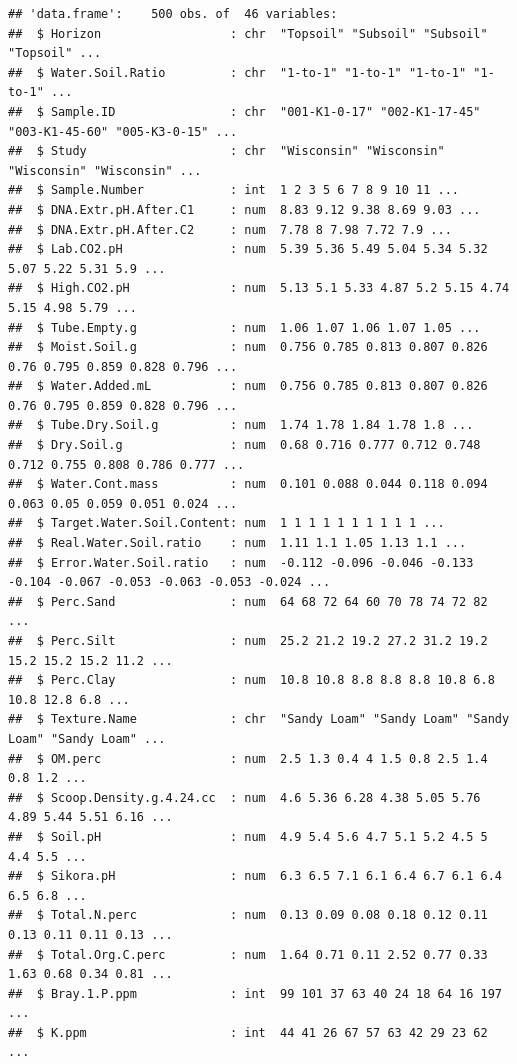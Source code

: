 \documentclass[]{article}
\begin{document}
\begin{verbatim}
## 'data.frame':    500 obs. of  46 variables:
##  $ Horizon                  : chr  "Topsoil" "Subsoil" "Subsoil" "Topsoil" ...
##  $ Water.Soil.Ratio         : chr  "1-to-1" "1-to-1" "1-to-1" "1-to-1" ...
##  $ Sample.ID                : chr  "001-K1-0-17" "002-K1-17-45" "003-K1-45-60" "005-K3-0-15" ...
##  $ Study                    : chr  "Wisconsin" "Wisconsin" "Wisconsin" "Wisconsin" ...
##  $ Sample.Number            : int  1 2 3 5 6 7 8 9 10 11 ...
##  $ DNA.Extr.pH.After.C1     : num  8.83 9.12 9.38 8.69 9.03 ...
##  $ DNA.Extr.pH.After.C2     : num  7.78 8 7.98 7.72 7.9 ...
##  $ Lab.CO2.pH               : num  5.39 5.36 5.49 5.04 5.34 5.32 5.07 5.22 5.31 5.9 ...
##  $ High.CO2.pH              : num  5.13 5.1 5.33 4.87 5.2 5.15 4.74 5.15 4.98 5.79 ...
##  $ Tube.Empty.g             : num  1.06 1.07 1.06 1.07 1.05 ...
##  $ Moist.Soil.g             : num  0.756 0.785 0.813 0.807 0.826 0.76 0.795 0.859 0.828 0.796 ...
##  $ Water.Added.mL           : num  0.756 0.785 0.813 0.807 0.826 0.76 0.795 0.859 0.828 0.796 ...
##  $ Tube.Dry.Soil.g          : num  1.74 1.78 1.84 1.78 1.8 ...
##  $ Dry.Soil.g               : num  0.68 0.716 0.777 0.712 0.748 0.712 0.755 0.808 0.786 0.777 ...
##  $ Water.Cont.mass          : num  0.101 0.088 0.044 0.118 0.094 0.063 0.05 0.059 0.051 0.024 ...
##  $ Target.Water.Soil.Content: num  1 1 1 1 1 1 1 1 1 1 ...
##  $ Real.Water.Soil.ratio    : num  1.11 1.1 1.05 1.13 1.1 ...
##  $ Error.Water.Soil.ratio   : num  -0.112 -0.096 -0.046 -0.133 -0.104 -0.067 -0.053 -0.063 -0.053 -0.024 ...
##  $ Perc.Sand                : num  64 68 72 64 60 70 78 74 72 82 ...
##  $ Perc.Silt                : num  25.2 21.2 19.2 27.2 31.2 19.2 15.2 15.2 15.2 11.2 ...
##  $ Perc.Clay                : num  10.8 10.8 8.8 8.8 8.8 10.8 6.8 10.8 12.8 6.8 ...
##  $ Texture.Name             : chr  "Sandy Loam" "Sandy Loam" "Sandy Loam" "Sandy Loam" ...
##  $ OM.perc                  : num  2.5 1.3 0.4 4 1.5 0.8 2.5 1.4 0.8 1.2 ...
##  $ Scoop.Density.g.4.24.cc  : num  4.6 5.36 6.28 4.38 5.05 5.76 4.89 5.44 5.51 6.16 ...
##  $ Soil.pH                  : num  4.9 5.4 5.6 4.7 5.1 5.2 4.5 5 4.4 5.5 ...
##  $ Sikora.pH                : num  6.3 6.5 7.1 6.1 6.4 6.7 6.1 6.4 6.5 6.8 ...
##  $ Total.N.perc             : num  0.13 0.09 0.08 0.18 0.12 0.11 0.13 0.11 0.11 0.13 ...
##  $ Total.Org.C.perc         : num  1.64 0.71 0.11 2.52 0.77 0.33 1.63 0.68 0.34 0.81 ...
##  $ Bray.1.P.ppm             : int  99 101 37 63 40 24 18 64 16 197 ...
##  $ K.ppm                    : int  44 41 26 67 57 63 42 29 23 62 ...

\end{verbatim}
\end{document}

